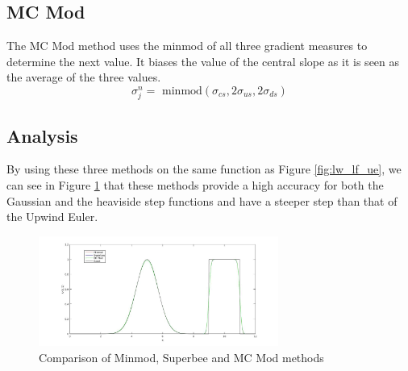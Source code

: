 \subsection{MC Mod}
The MC Mod method uses the minmod of all three gradient measures to determine the next value. It biases the value of the central slope as it is seen as the average of the three values.
\begin{equation*}
  \sigma^n_j = \text{ minmod}(\sigma_{cs},2\sigma_{us},2\sigma_{ds})
\end{equation*}
\subsection{Analysis}
By using these three methods on the same function as Figure \ref{fig:lw_lf_ue}, we can see in Figure \ref{fig:mm_sb_mc} that these methods provide a high accuracy for both the Gaussian and the heaviside step functions and have a steeper step than that of the Upwind Euler.
\begin{figure}[H]
  \centering
  \includegraphics[width=0.7\textwidth]{Images/7_mm_sb_mc.jpg}
  \caption{Comparison of Minmod, Superbee and MC Mod methods}\label{fig:mm_sb_mc}
\end{figure}